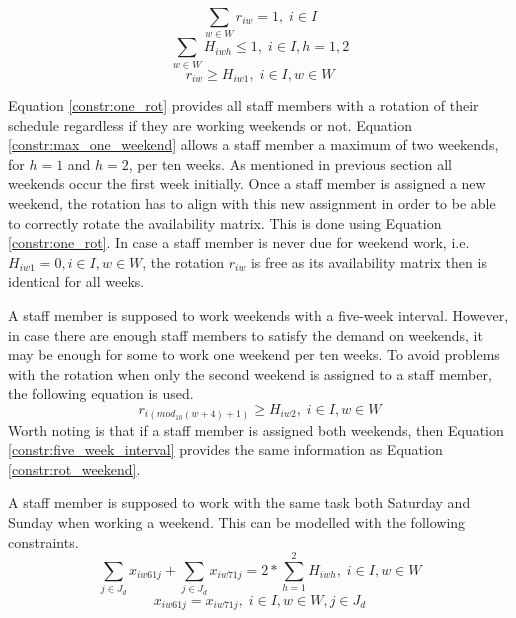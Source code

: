\begin{equation} \label{constr:one_rot}
\sum_{w \in W} r_{iw} = 1, \;   i\in I
\end{equation}
\begin{equation} \label{constr:max_one_weekend}
\sum_{w \in W} H_{iwh} \leq 1, \;   i\in I, h = 1,2
\end{equation}
\begin{equation} \label{constr:rot_weekend}
r_{iw} \geq H_{iw1}, \;   i\in I, w \in W
\end{equation}

Equation \ref{constr:one_rot} provides all staff members with a rotation of their schedule regardless if they are working weekends or not. Equation \ref{constr:max_one_weekend} allows a staff member a maximum of two weekends, for $h=1$ and $h=2$, per ten weeks. As mentioned in previous section all weekends occur the first week initially. Once a staff member is assigned a new weekend, the rotation has to align with this new assignment in order to be able to correctly rotate the availability matrix. This is done using Equation \ref{constr:one_rot}. In case a staff member is never due for weekend work, i.e. $H_{iw1} = 0,   i\in I, w \in W$, the rotation $r_{iw}$ is free as its availability matrix then is identical for all weeks. 

A staff member is supposed to work weekends with a five-week interval. However, in case there are enough staff members to satisfy the demand on weekends, it may be enough for some to work one weekend per ten weeks. To avoid problems with the rotation when only the second weekend is assigned to a staff member, the following equation is used.
\begin{equation} \label{constr:five_week_interval}
r_{i(mod_{10}(w+4)+1)} \geq H_{iw2}, \;   i\in I, w \in W
\end{equation}
Worth noting is that if a staff member is assigned both weekends, then Equation \ref{constr:five_week_interval} provides the same information as Equation \ref{constr:rot_weekend}.

A staff member is supposed to work with the same task both Saturday and Sunday when working a weekend. This can be modelled with the following constraints.
\begin{equation} \label{constr:consecutive_days}
\sum_{j \in J_d} x_{iw61j} + \sum_{j \in J_d} x_{iw71j} = 2*\sum_{h = 1}^{2} H_{iwh}, \;   i\in I, w \in W
\end{equation}
\begin{equation} \label{constr:same_tasks}
x_{iw61j} = x_{iw71j}, \;   i\in I, w \in W, j \in J_d
\end{equation}

